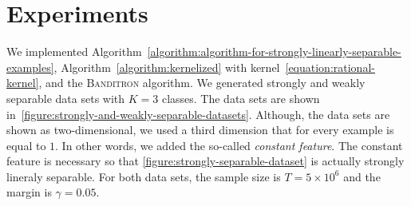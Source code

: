 \section{Experiments}
\label{section:experiments}

We implemented
Algorithm~\ref{algorithm:algorithm-for-strongly-linearly-separable-examples},
Algorithm~\ref{algorithm:kernelized} with
kernel~\eqref{equation:rational-kernel}, and the \textsc{Banditron} algorithm.
We generated strongly and weakly separable data sets with $K=3$ classes. The
data sets are shown in~\autoref{figure:strongly-and-weakly-separable-datasets}.
Although, the data sets are shown as two-dimensional, we used a third dimension
that for every example is equal to $1$. In other words, we added the so-called
\emph{constant feature}. The constant feature is necessary so that
\autoref{figure:strongly-separable-dataset} is actually strongly lineraly
separable. For both data sets, the sample size is $T=5\times 10^6$ and the
margin is $\gamma=0.05$.


